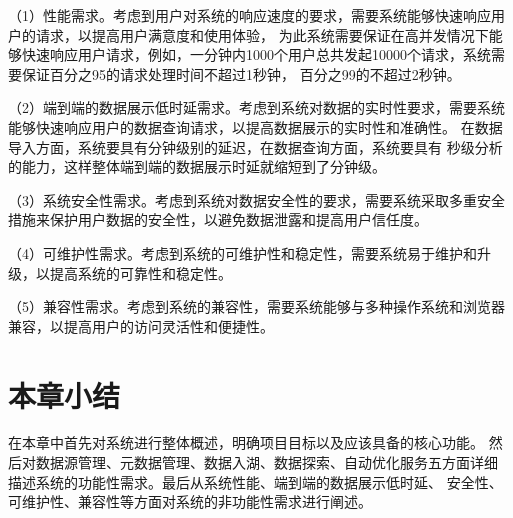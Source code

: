 （1）性能需求。考虑到用户对系统的响应速度的要求，需要系统能够快速响应用户的请求，以提高用户满意度和使用体验，
为此系统需要保证在高并发情况下能够快速响应用户请求，例如，一分钟内1000个用户总共发起10000个请求，系统需要保证百分之95的请求处理时间不超过1秒钟，
百分之99的不超过2秒钟。

（2）端到端的数据展示低时延需求。考虑到系统对数据的实时性要求，需要系统能够快速响应用户的数据查询请求，以提高数据展示的实时性和准确性。
在数据导入方面，系统要具有分钟级别的延迟，在数据查询方面，系统要具有
秒级分析的能力，这样整体端到端的数据展示时延就缩短到了分钟级。

（3）系统安全性需求。考虑到系统对数据安全性的要求，需要系统采取多重安全措施来保护用户数据的安全性，以避免数据泄露和提高用户信任度。

（4）可维护性需求。考虑到系统的可维护性和稳定性，需要系统易于维护和升级，以提高系统的可靠性和稳定性。

（5）兼容性需求。考虑到系统的兼容性，需要系统能够与多种操作系统和浏览器兼容，以提高用户的访问灵活性和便捷性。

\section{本章小结}

在本章中首先对系统进行整体概述，明确项目目标以及应该具备的核心功能。
然后对数据源管理、元数据管理、数据入湖、数据探索、自动优化服务五方面详细
描述系统的功能性需求。最后从系统性能、端到端的数据展示低时延、
安全性、可维护性、兼容性等方面对系统的非功能性需求进行阐述。

